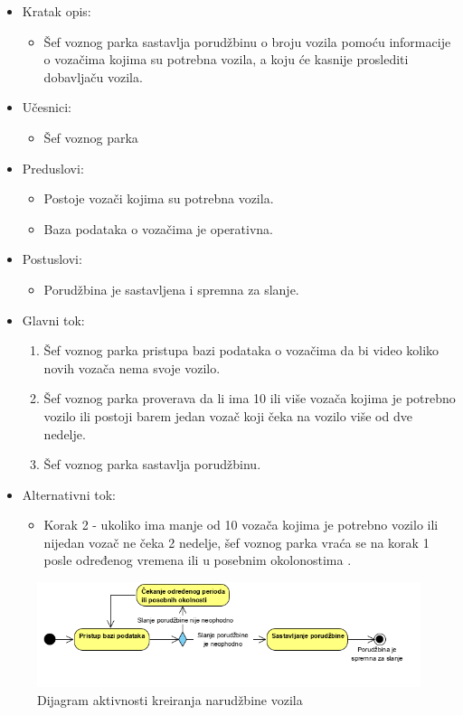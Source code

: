 \begin{itemize}
	\item Kratak opis:
		\begin{itemize}
			\item Šef voznog parka sastavlja porudžbinu o broju vozila pomoću informacije o vozačima kojima su potrebna vozila, a koju će kasnije proslediti dobavljaču vozila.
		\end{itemize}
	\item Učesnici:
		\begin{itemize}
		    \item Šef voznog parka
		\end{itemize}
	\item Preduslovi:
		\begin{itemize}
		    \item Postoje vozači kojima su potrebna vozila.
		    \item Baza podataka o vozačima je operativna.
		\end{itemize}
	\item Postuslovi:
		\begin{itemize}
			\item Porudžbina je sastavljena i spremna za slanje.
	\end{itemize}
	\item Glavni tok:
		\begin{enumerate}
		    \item Šef voznog parka pristupa bazi podataka o vozačima da bi video koliko novih vozača nema svoje vozilo.
		    \item Šef voznog parka proverava da li ima 10 ili više vozača kojima je potrebno vozilo ili postoji barem jedan vozač koji čeka na vozilo više od dve nedelje.
		    \item Šef voznog parka sastavlja porudžbinu.
		\end{enumerate}
	\item Alternativni tok:
		\begin{itemize}
		    \item Korak 2 - ukoliko ima manje od 10 vozača kojima je potrebno vozilo ili nijedan vozač ne čeka 2 nedelje, šef voznog parka vraća se na korak 1 posle određenog vremena ili u posebnim okolonostima .
		\end{itemize}
\end{itemize}

\begin{figure}[H]
\begin{left}
\includegraphics[width=\textwidth]{Slike/NarucivanjeVozila.png}
\end{left}
    \caption{Dijagram aktivnosti kreiranja narudžbine vozila}
\label{fig:NaručivanjeVozila}
\end{figure}

